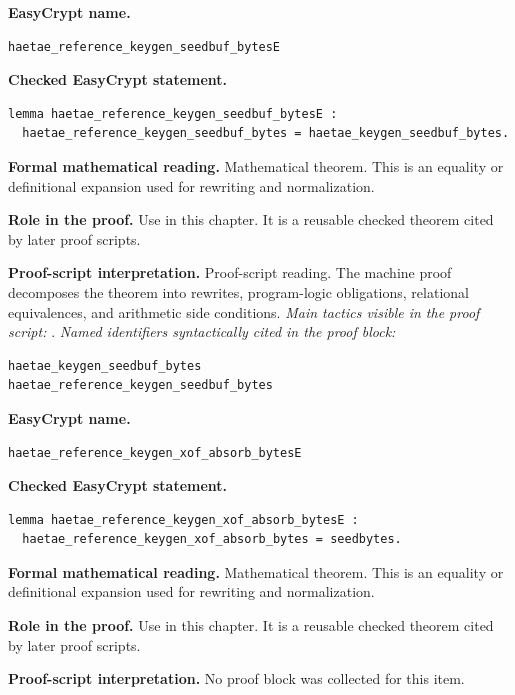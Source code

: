 \begin{formaltheorem}
\noindent\textbf{EasyCrypt name.}
\begin{lstlisting}[language=EasyCrypt,basicstyle=\ttfamily\scriptsize]
haetae_reference_keygen_seedbuf_bytesE
\end{lstlisting}
\noindent\textbf{Checked EasyCrypt statement.}
\begin{lstlisting}[language=EasyCrypt,basicstyle=\ttfamily\scriptsize]
lemma haetae_reference_keygen_seedbuf_bytesE :
  haetae_reference_keygen_seedbuf_bytes = haetae_keygen_seedbuf_bytes.
\end{lstlisting}
\noindent\textbf{Formal mathematical reading.}
Mathematical theorem. This is an equality or definitional expansion used for rewriting and normalization.

\noindent\textbf{Role in the proof.}
Use in this chapter. It is a reusable checked theorem cited by later proof scripts.

\noindent\textbf{Proof-script interpretation.}
Proof-script reading. The machine proof decomposes the theorem into rewrites, program-logic obligations, relational equivalences, and arithmetic side conditions.
\emph{Main tactics visible in the proof script:} .
\emph{Named identifiers syntactically cited in the proof block:}
\begin{lstlisting}[language=EasyCrypt,basicstyle=\ttfamily\scriptsize]
haetae_keygen_seedbuf_bytes
haetae_reference_keygen_seedbuf_bytes
\end{lstlisting}

\end{formaltheorem}

\begin{formaltheorem}
\noindent\textbf{EasyCrypt name.}
\begin{lstlisting}[language=EasyCrypt,basicstyle=\ttfamily\scriptsize]
haetae_reference_keygen_xof_absorb_bytesE
\end{lstlisting}
\noindent\textbf{Checked EasyCrypt statement.}
\begin{lstlisting}[language=EasyCrypt,basicstyle=\ttfamily\scriptsize]
lemma haetae_reference_keygen_xof_absorb_bytesE :
  haetae_reference_keygen_xof_absorb_bytes = seedbytes.
\end{lstlisting}
\noindent\textbf{Formal mathematical reading.}
Mathematical theorem. This is an equality or definitional expansion used for rewriting and normalization.

\noindent\textbf{Role in the proof.}
Use in this chapter. It is a reusable checked theorem cited by later proof scripts.

\noindent\textbf{Proof-script interpretation.}
No proof block was collected for this item.

\end{formaltheorem}

